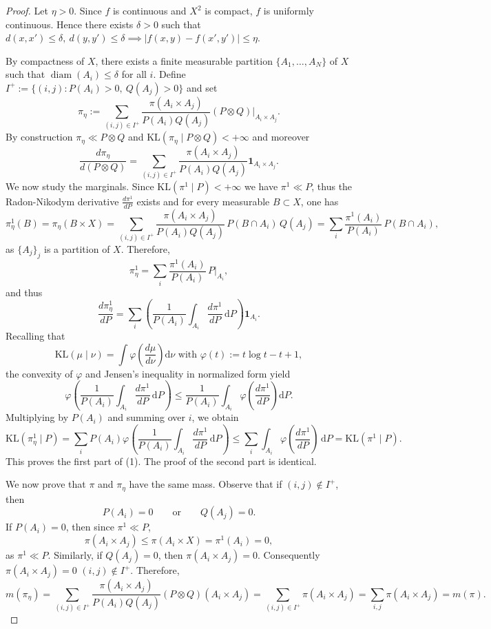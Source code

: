 \documentclass{article}
\theoremstyle{plain}
\theoremstyle{definition}
\theoremstyle{remark}
\begin{document}
\begin{proof}
Let \(\eta>0\). Since $f$ is continuous and \(X^2\) is compact, \(f\) is uniformly continuous. Hence there exists \(\delta>0\) such that
$d(x,x')\le \delta, ~ d(y,y') \le \delta \implies 
|f(x,y)-f(x',y')|
\le \eta.$

By compactness of \(X\), there exists a finite measurable partition
$\{A_1,\dots,A_N\}$
of \(X\) such that
$
\operatorname{diam}(A_i)\le \delta$ for all $i$.
Define
$I^+
:=
\{(i,j): P(A_i)>0,\ Q(A_j)>0\}$ 
and set
\[
\pi_\eta
:=
\sum_{(i,j)\in I^+}
\frac{\pi(A_i\times A_j)}{P(A_i)Q(A_j)}
(P\otimes Q)|_{A_i\times A_j}.
\]
By construction $\pi_\eta \ll P \otimes Q$ and $\mathrm{KL}(\pi_\eta\mid P\otimes Q)<+\infty$ and moreover
\[
\frac{d\pi_\eta}{d(P\otimes Q)}
=
\sum_{(i,j)\in I^+}
\frac{\pi(A_i\times A_j)}{P(A_i)Q(A_j)}
\mathbf 1_{A_i\times A_j}.
\]
We now study the marginals. Since
$\mathrm{KL}(\pi^1\mid P)<+\infty$
we have \(\pi^1\ll P\), thus the Radon-Nikodym derivative $\frac{d\pi^1}{dP}$
exists and for every measurable \(B\subset X\), one has
\[
\pi_\eta^1(B) =
\pi_\eta(B\times X) =
\sum_{(i,j)\in I^+}
\frac{\pi(A_i\times A_j)}{P(A_i)Q(A_j)}
\,P(B\cap A_i)\,Q(A_j)=
\sum_i
\frac{\pi^1(A_i)}{P(A_i)}
\,P(B\cap A_i),
\]
as \(\{A_j\}_j\) is a partition of \(X\). Therefore,
\[
\pi_\eta^1
=
\sum_i
\frac{\pi^1(A_i)}{P(A_i)}
\,P|_{A_i},
\]
and thus
\[
\frac{d\pi_\eta^1}{dP}
=
\sum_i
\left(
\frac1{P(A_i)}
\int_{A_i}\frac{d\pi^1}{dP}\, \mathrm{d}P
\right)\mathbf 1_{A_i}.
\]
Recalling that
\[
\mathrm{KL}(\mu\mid \nu)
=
\int
\varphi\!\left(\frac{d\mu}{d\nu}\right)\mathrm{d}\nu
\text{ with }
\varphi(t):= t\log t - t +1,
\]
the convexity of \(\varphi\) and Jensen's inequality in normalized form yield
\[
\varphi\!\left(
\frac1{P(A_i)}
\int_{A_i}\frac{d\pi^1}{dP}\, \mathrm{d}P
\right)
\le
\frac1{P(A_i)}
\int_{A_i}
\varphi \left(\frac{d\pi^1}{dP}\right) \mathrm{d}P.
\]
Multiplying by \(P(A_i)\) and summing over \(i\), we obtain
\[
\mathrm{KL}(\pi_\eta^1\mid P)
=
\sum_i
P(A_i)
\varphi\!\left(
\frac1{P(A_i)}
\int_{A_i}\frac{d\pi^1}{dP}\, \mathrm{d}P
\right) 
\le
\sum_i
\int_{A_i}
\varphi \left(\frac{d\pi^1}{dP}\right)\, \mathrm{d}P 
=
\mathrm{KL}(\pi^1\mid P).
\]
This proves the first part of (1). The proof of the second part is identical.

We now prove that $\pi$ and $\pi_\eta$ have the same mass. Observe that if \((i,j)\notin I^+\), then
\[
P(A_i)=0
\qquad
\text{or}
\qquad
Q(A_j)=0.
\]
If \(P(A_i)=0\), then since \(\pi^1\ll P\),
\[
\pi(A_i\times A_j)
\le
\pi(A_i\times X)
=
\pi^1(A_i)
=
0,
\]
as \(\pi^1\ll P\).
Similarly, if \(Q(A_j)=0\), then $\pi(A_i\times A_j)=0$.
Consequently $
\pi(A_i\times A_j)=0$
$(i,j)\notin I^+$.
Therefore,
\[
m(\pi_\eta)
=
\sum_{(i,j)\in I^+}
\frac{\pi(A_i\times A_j)}{P(A_i)Q(A_j)}
(P\otimes Q)(A_i\times A_j) 
=
\sum_{(i,j)\in I^+}
\pi(A_i\times A_j) 
=
\sum_{i,j}
\pi(A_i\times A_j) 
=
m(\pi).
\]


\end{proof}
\end{document}
